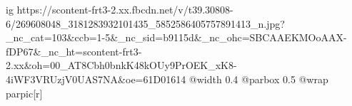  
 
 
 
 

\ifcmt
  ig https://scontent-frt3-2.xx.fbcdn.net/v/t39.30808-6/269608048_3181283932101435_5852586405757891413_n.jpg?_nc_cat=103&ccb=1-5&_nc_sid=b9115d&_nc_ohc=SBCAAEKMOoAAX-fDP67&_nc_ht=scontent-frt3-2.xx&oh=00_AT8Cbh0bnkK48kOUy9PrOEK_xK8-4iWF3VRUzjV0UAS7NA&oe=61D01614
  @width 0.4
	@parbox 0.5
	@wrap parpic[r]
\fi
